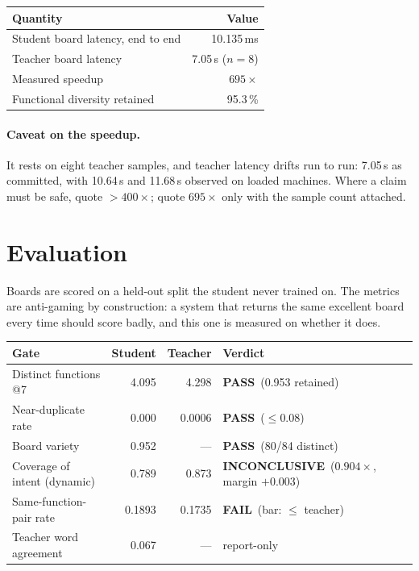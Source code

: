 \documentclass[11pt,a4paper]{article}
\newcommand{\PASS}{\textcolor{pass}{\textbf{PASS}}}
\newcommand{\INC}{\textcolor{warn}{\textbf{INCONCLUSIVE}}}
\newcommand{\FAIL}{\textcolor{fail}{\textbf{FAIL}}}
\begin{document}
\begin{center}
\begin{tabular}{@{}lr@{}}
\toprule
\textbf{Quantity} & \textbf{Value} \\
\midrule
Student board latency, end to end   & 10.135\,ms \\
Teacher board latency               & 7.05\,s ($n=8$) \\
Measured speedup                    & $695\times$ \\
Functional diversity retained       & 95.3\,\% \\
\bottomrule
\end{tabular}
\end{center}

\paragraph{Caveat on the speedup.} It rests on eight teacher samples, and teacher latency
drifts run to run: 7.05\,s as committed, with 10.64\,s and 11.68\,s observed on loaded
machines. Where a claim must be safe, quote $>\!400\times$; quote $695\times$ only with
the sample count attached.

\section{Evaluation}

Boards are scored on a held-out split the student never trained on. The metrics are
anti-gaming by construction: a system that returns the same excellent board every time
should score badly, and this one is measured on whether it does.

\begin{center}
\small\begin{tabular}{@{}lrr>{\raggedright\arraybackslash}p{4.6cm}@{}}
\toprule
\textbf{Gate} & \textbf{Student} & \textbf{Teacher} & \textbf{Verdict} \\
\midrule
Distinct functions @7            & 4.095  & 4.298  & \PASS\ (0.953 retained) \\
Near-duplicate rate              & 0.000  & 0.0006 & \PASS\ ($\le 0.08$) \\
Board variety                    & 0.952  & ---    & \PASS\ (80/84 distinct) \\
Coverage of intent (dynamic)     & 0.789  & 0.873  & \INC\ ($0.904\times$, margin $+0.003$) \\
Same-function-pair rate          & 0.1893 & 0.1735 & \FAIL\ (bar: $\le$ teacher) \\
Teacher word agreement           & 0.067  & ---    & report-only \\
\bottomrule
\end{tabular}
\end{center}
\end{document}
